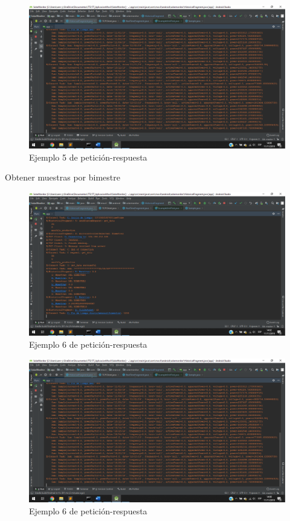 \begin{figure}[H]
	\centering
	\includegraphics[scale=.4]{Capitulo5/images/connect13.png}
	\caption{Ejemplo 5 de petición-respuesta}	\label{fig:connect13}
\end{figure} 

Obtener muestras por bimestre
\begin{figure}[H]
	\centering
	\includegraphics[scale=.4]{Capitulo5/images/connect14.png}
	\caption{Ejemplo 6 de petición-respuesta}	\label{fig:connect14}
\end{figure} 

\begin{figure}[H]
	\centering
	\includegraphics[scale=.4]{Capitulo5/images/connect15.png}
	\caption{Ejemplo 6 de petición-respuesta}	\label{fig:connect15}
\end{figure} 

